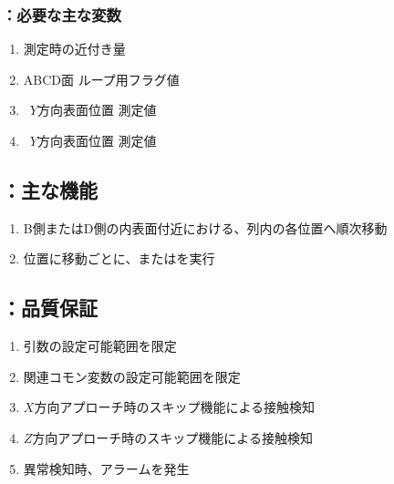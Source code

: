 \subsubsection{\DLtwoBD：必要な主な変数}
\begin{enumerate}[label*=\sarrow]
\item \TouchSensorProbe 測定時の近付き量
\item ABCD面 ループ用フラグ値
\item \BfaceDimple~$Y$方向表面位置 測定値
\item \DfaceDimple~$Y$方向表面位置 測定値
\end{enumerate}


\subsection{\DLtwoBD：主な機能}
\begin{enumerate}[label*=\sarrow]
\item B側またはD側の内表面付近における、列内の各\Dimple 位置へ順次移動
\item \Dimple 位置に移動ごとに、\DMLthreeBD または\DKLthreeBD を実行
\end{enumerate}


\clearpage
\subsection{\DLtwoBD：品質保証}
\begin{enumerate}[label*=\sarrow]
\item {}引数の設定可能範囲を限定
\item 関連コモン変数の設定可能範囲を限定
\item $X$方向アプローチ時のスキップ機能による接触検知
\item $Z$方向アプローチ時のスキップ機能による接触検知
\item 異常検知時、アラームを発生
\end{enumerate}



